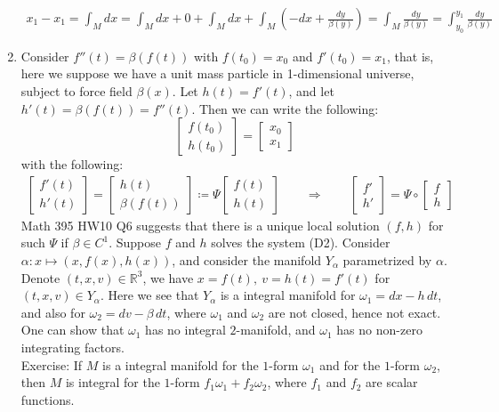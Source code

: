 \documentclass[11pt,oneside]{book}
\theoremstyle{break}
\theoremstyle{break}
\newcommand{\R}{\mathbb{R}}
\newcommand{\bmat}[1]{\begin{bmatrix} #1 \end{bmatrix}}
\newcommand{\exercise}{\color{green}Exercise: \color{black}}
\begin{document}
\begin{enumerate}
\begin{center}
\end{center}
\begin{align*}
x_1 - x_1 = \int_M dx = \int_M dx + 0 + \int_M dx + \int_M \left( -dx + \frac{dy}{\beta(y)}\right) = \int_M \frac{dy}{\beta(y)} = \int_{y_0}^{y_1}\frac{dy}{\beta(y)}
\end{align*}
\item Consider $f''(t) = \beta(f(t))$ with $f(t_0) = x_0$ and $f'(t_0) = x_1$, that is, here we suppose we have a unit mass particle in 1-dimensional universe, subject to force field $\beta (x)$. Let $h(t) = f'(t)$, and let $h'(t) = \beta(f(t)) = f''(t)$. Then we can write the following:
$$ \bmat{f(t_0)\\ h(t_0)} = \bmat{x_0\\x_1}$$
with the following:
\begin{align*}
\bmat{f'(t) \\ h'(t)} = \bmat{h(t) \\ \beta(f(t))} \coloneqq \Psi\bmat{f(t) \\ h(t)} \qquad\Rightarrow \qquad \bmat{f'\\ h'} = \Psi \circ \bmat{f \\ h} \tag{D2}
\end{align*}
Math 395 HW10 Q6 suggests that there is a unique local solution $(f,h)$ for such $\Psi$ if $\beta\in C^1$. Suppose $f$ and $h$ solves the system (D2). Consider $\alpha: x\mapsto (x, f(x), h(x))$, and consider the manifold $Y_\alpha$ parametrized by $\alpha$. Denote $(t,x,v) \in \R^3$, we have $x= f(t), \ v=h(t) = f'(t)$ for $(t,x,v) \in Y_{\alpha}$. Here we see that $Y_\alpha$ is a integral manifold for $\omega_1 = dx - h\,dt$, and also for $\omega_2 = dv -\beta\, dt$, where $\omega_1$ and $\omega_2$ are not closed, hence not exact. One can show that $\omega_1$ has no integral $2$-manifold, and $\omega_1$ has no non-zero integrating factors. \\

\exercise If $M$ is a integral manifold for the $1$-form $\omega_1$ and for the $1$-form $\omega_2$, then $M$ is integral for the $1$-form $f_1 \omega_1 + f_2 \omega_2$, where $f_1$ and $f_2$ are scalar functions.  \\


\end{enumerate}
\end{document}
